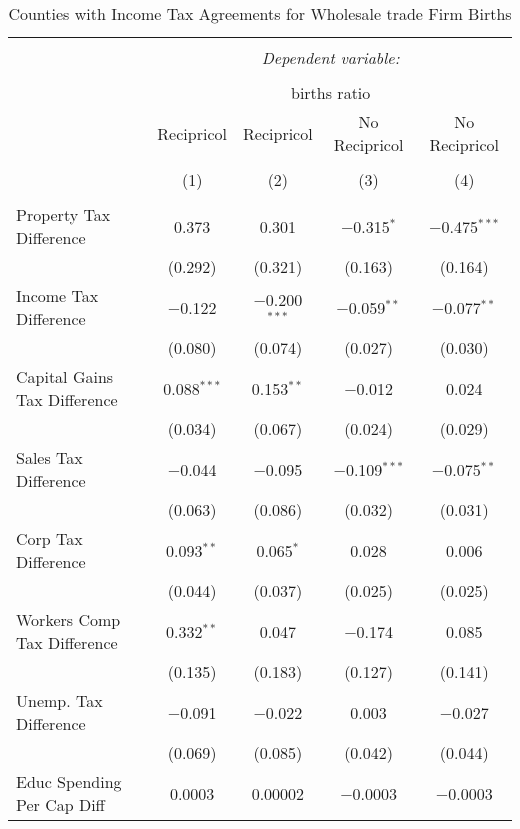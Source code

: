 
\begin{table}[!htbp] \centering 
  \caption{Counties with Income Tax Agreements for  Wholesale trade Firm Births} 
  \label{42agreement} 
\begin{tabular}{@{\extracolsep{5pt}}lcccc} 
\\[-1.8ex]\hline 
\hline \\[-1.8ex] 
 & \multicolumn{4}{c}{\textit{Dependent variable:}} \\ 
\cline{2-5} 
\\[-1.8ex] & \multicolumn{4}{c}{births ratio} \\ 
 & Recipricol & Recipricol & No Recipricol & No Recipricol \\ 
\\[-1.8ex] & (1) & (2) & (3) & (4)\\ 
\hline \\[-1.8ex] 
 Property Tax Difference & 0.373 & 0.301 & $-$0.315$^{*}$ & $-$0.475$^{***}$ \\ 
  & (0.292) & (0.321) & (0.163) & (0.164) \\ 
  Income Tax Difference & $-$0.122 & $-$0.200$^{***}$ & $-$0.059$^{**}$ & $-$0.077$^{**}$ \\ 
  & (0.080) & (0.074) & (0.027) & (0.030) \\ 
  Capital Gains Tax Difference & 0.088$^{***}$ & 0.153$^{**}$ & $-$0.012 & 0.024 \\ 
  & (0.034) & (0.067) & (0.024) & (0.029) \\ 
  Sales Tax Difference & $-$0.044 & $-$0.095 & $-$0.109$^{***}$ & $-$0.075$^{**}$ \\ 
  & (0.063) & (0.086) & (0.032) & (0.031) \\ 
  Corp Tax Difference & 0.093$^{**}$ & 0.065$^{*}$ & 0.028 & 0.006 \\ 
  & (0.044) & (0.037) & (0.025) & (0.025) \\ 
  Workers Comp Tax Difference & 0.332$^{**}$ & 0.047 & $-$0.174 & 0.085 \\ 
  & (0.135) & (0.183) & (0.127) & (0.141) \\ 
  Unemp. Tax Difference & $-$0.091 & $-$0.022 & 0.003 & $-$0.027 \\ 
  & (0.069) & (0.085) & (0.042) & (0.044) \\ 
  Educ Spending Per Cap Diff & 0.0003 & 0.00002 & $-$0.0003 & $-$0.0003 \\ 

\end{tabular}
\end{table}
